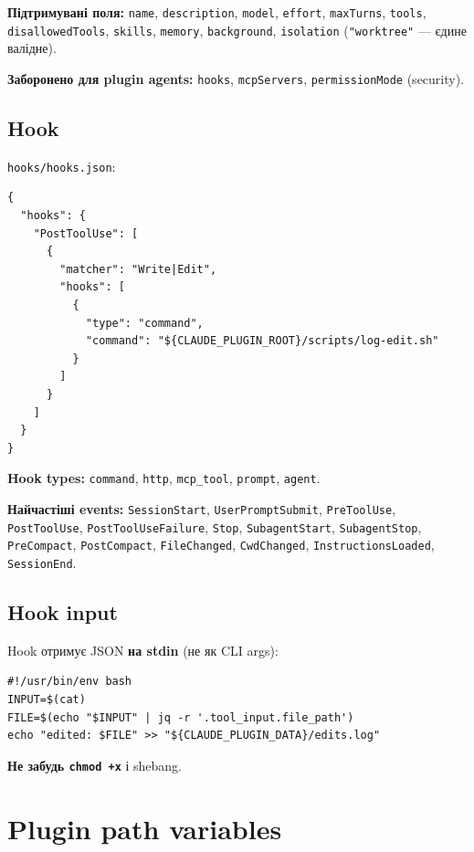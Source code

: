 \documentclass[11pt,a4paper]{article}
\begin{document}
\textbf{Підтримувані поля:} \texttt{name}, \texttt{description}, \texttt{model}, \texttt{effort}, \texttt{maxTurns}, \texttt{tools}, \texttt{disallowedTools}, \texttt{skills}, \texttt{memory}, \texttt{background}, \texttt{isolation} (\texttt{"worktree"} --- єдине валідне).

\textbf{Заборонено для plugin agents:} \texttt{hooks}, \texttt{mcpServers}, \texttt{permissionMode} (security).

\subsection{Hook}

\texttt{hooks/hooks.json}:

\begin{lstlisting}
{
  "hooks": {
    "PostToolUse": [
      {
        "matcher": "Write|Edit",
        "hooks": [
          {
            "type": "command",
            "command": "${CLAUDE_PLUGIN_ROOT}/scripts/log-edit.sh"
          }
        ]
      }
    ]
  }
}
\end{lstlisting}

\textbf{Hook types:} \texttt{command}, \texttt{http}, \texttt{mcp\_tool}, \texttt{prompt}, \texttt{agent}.

\textbf{Найчастіші events:} \texttt{SessionStart}, \texttt{UserPromptSubmit}, \texttt{PreToolUse}, \texttt{PostToolUse}, \texttt{PostToolUseFailure}, \texttt{Stop}, \texttt{SubagentStart}, \texttt{SubagentStop}, \texttt{PreCompact}, \texttt{PostCompact}, \texttt{FileChanged}, \texttt{CwdChanged}, \texttt{InstructionsLoaded}, \texttt{SessionEnd}.

\subsection{Hook input}

Hook отримує JSON \textbf{на stdin} (не як CLI args):

\begin{lstlisting}
#!/usr/bin/env bash
INPUT=$(cat)
FILE=$(echo "$INPUT" | jq -r '.tool_input.file_path')
echo "edited: $FILE" >> "${CLAUDE_PLUGIN_DATA}/edits.log"
\end{lstlisting}

\textbf{Не забудь \texttt{chmod +x}} і shebang.

\section{Plugin path variables}
\end{document}
